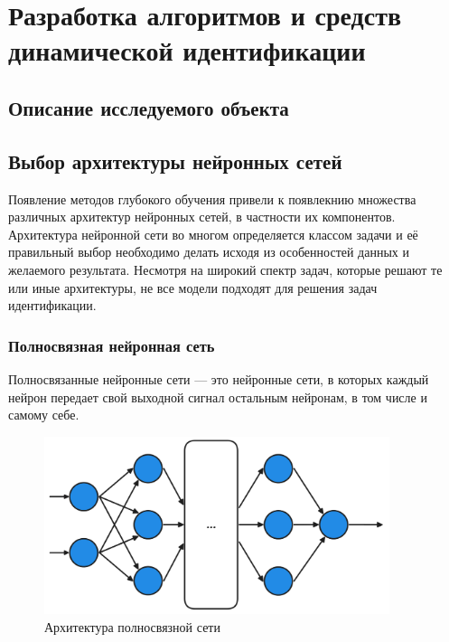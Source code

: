 \chapter{Разработка алгоритмов и средств динамической идентификации}
 
\section{Описание исследуемого объекта}

\section{Выбор архитектуры нейронных сетей}

Появление методов глубокого обучения привели к появлекнию множества различных архитектур нейронных сетей, в частности их компонентов. Архитектура нейронной сети во многом определяется классом задачи и её правильный выбор необходимо делать исходя из особенностей данных и желаемого результата. Несмотря на широкий спектр задач, которые решают те или иные архитектуры, не все модели подходят для решения задач идентификации.

\subsection{Полносвязная нейронная сеть}

Полносвязанные нейронные сети — это нейронные сети, в которых каждый 
нейрон передает свой выходной сигнал остальным нейронам, в том числе 
и самому себе. 

\begin{figure}[H]
  \centering
    \includegraphics[width=0.9\textwidth]{figures/arch_fully_connected.png}
  \caption{Архитектура полносвязной сети}\label{fig:dense_nn}
\end{figure}

